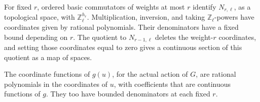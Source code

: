 \begin{lemma}
\label{lem:ghost-hall-model}
For fixed \(r\), ordered basic commutators of weights at most
\(r\) identify \(N_{r,\ell}\), as a topological space, with
\(\mathbb Z_\ell^{h_r}\). Multiplication, inversion, and taking
\(\mathbb Z_\ell\)-powers have coordinates given by rational
polynomials. Their denominators have a fixed bound depending on
\(r\). The quotient to \(N_{r-1,\ell}\) deletes the weight-\(r\)
coordinates, and setting those coordinates equal to zero gives a
continuous section of this quotient as a map of spaces.

The coordinate functions of \(g(u)\), for the actual action of
\(G\), are rational polynomials in the coordinates of \(u\),
with coefficients that are continuous functions of \(g\).
They too have bounded denominators at each fixed \(r\).
\end{lemma}
